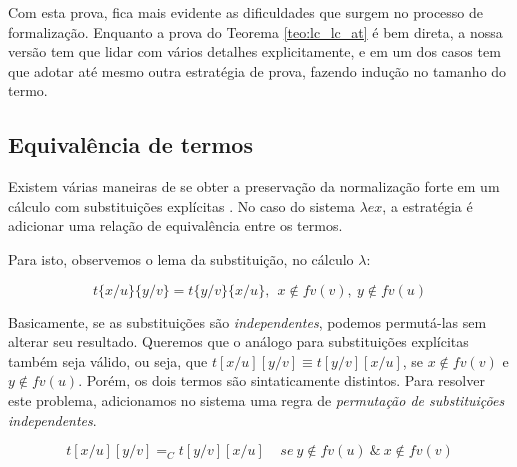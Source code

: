Com esta prova, fica mais evidente as dificuldades que surgem no processo de
formalização. Enquanto a prova do Teorema \ref{teo:lc_lc_at} é bem direta,
a nossa versão tem que lidar com vários detalhes explicitamente, e em um dos
casos tem que adotar até mesmo outra estratégia de prova, fazendo indução no
tamanho do termo. 

\subsection{Equivalência de termos}
\label{sub:equival_ncia_de_termos}

Existem várias maneiras de se obter a preservação da normalização forte em um
cálculo com substituições explícitas \cite{delia}. No caso do sistema $\lambda
ex$, a estratégia é adicionar uma relação de equivalência entre os termos.




Para isto, observemos o lema da substituição, no cálculo $\lambda$:

\[ t\{x/u\}\{y/v\} = t\{y/v\}\{x/u\},\ \ x \notin fv(v),\ y \notin fv(u) \]

Basicamente, se as substituições são \emph{independentes}, podemos permutá-las
sem alterar seu resultado. Queremos que o análogo para substituições explícitas
também seja válido, ou seja, que $t[x/u][y/v] \equiv t[y/v][x/u]$, se $x \notin
fv(v)$ e $y \notin fv(u)$.  Porém, os dois termos são sintaticamente distintos.
Para resolver este problema, adicionamos no sistema uma regra de
\emph{permutação de substituições independentes}.

\[ t[x/u][y/v] =_C t[y/v][x/u] \ \ \ \ \ se\ y \notin fv(u)\ \&\ x \notin fv(v)\] 


